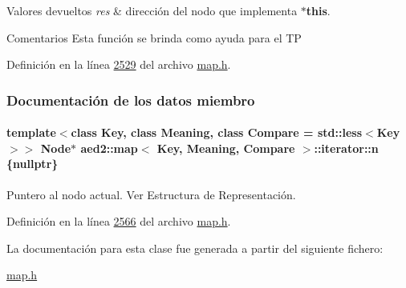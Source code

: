 \begin{DoxyRetVals}{Valores devueltos}
{\em res} & dirección del nodo que implementa {\bfseries $\ast$this}.\\
\hline
\end{DoxyRetVals}
\begin{DoxyRemark}{Comentarios}
Esta función se brinda como ayuda para el T\-P 
\end{DoxyRemark}


Definición en la línea \hyperlink{map_8h_source_l02529}{2529} del archivo \hyperlink{map_8h_source}{map.\-h}.



\subsubsection{Documentación de los datos miembro}
\hypertarget{classaed2_1_1map_1_1iterator_adf8633ef71bb6c1fc01c0abe8728fd93_adf8633ef71bb6c1fc01c0abe8728fd93}{
\paragraph[{n}]{\setlength{\rightskip}{0pt plus 5cm}template$<$class Key, class Meaning, class Compare = std\-::less$<$\-Key$>$$>$ Node$\ast$ {\bf aed2\-::map}$<$ Key, Meaning, Compare $>$\-::iterator\-::n \{nullptr\}\hspace{0.3cm}{\ttfamily [private]}}}\label{classaed2_1_1map_1_1iterator_adf8633ef71bb6c1fc01c0abe8728fd93_adf8633ef71bb6c1fc01c0abe8728fd93}


Puntero al nodo actual. Ver Estructura de Representación. 



Definición en la línea \hyperlink{map_8h_source_l02566}{2566} del archivo \hyperlink{map_8h_source}{map.\-h}.



La documentación para esta clase fue generada a partir del siguiente fichero\-:\begin{DoxyCompactItemize}
\item 
\hyperlink{map_8h}{map.\-h}\end{DoxyCompactItemize}

